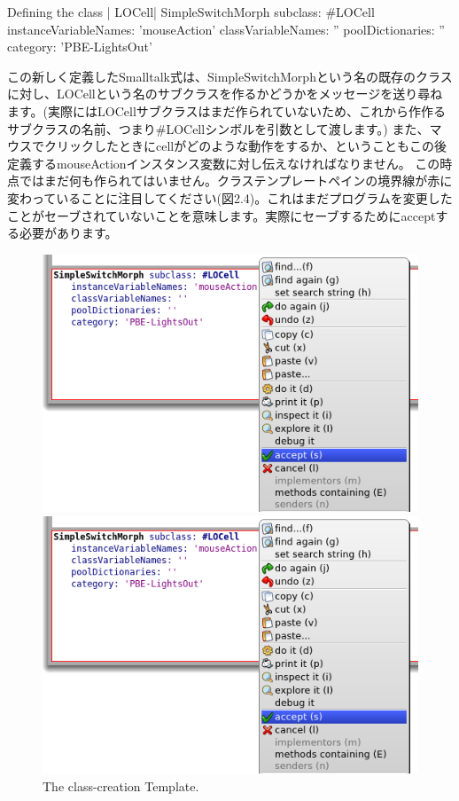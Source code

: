 \documentclass[a4paper,10pt,twoside]{book}
\begin{document}
\begin{classdef}[firstClassDef]{Defining the class \ct| LOCell|}
SimpleSwitchMorph subclass: #LOCell
   instanceVariableNames: 'mouseAction'
   classVariableNames: ''
   poolDictionaries: ''
   category: 'PBE-LightsOut'
\end{classdef}

この新しく定義したSmalltalk式は、SimpleSwitchMorphという名の既存のクラスに対し、LOCellという名のサブクラスを作るかどうかをメッセージを送り尋ねます。(実際にはLOCellサブクラスはまだ作られていないため、これから作作るサブクラスの名前、つまり#LOCellシンボルを引数として渡します。)
また、マウスでクリックしたときにcellがどのような動作をするか、ということもこの後定義するmouseActionインスタンス変数に対し伝えなければなりません。
この時点ではまだ何も作られてはいません。クラステンプレートペインの境界線が赤に変わっていることに注目してください(図2.4)。これはまだプログラムを変更したことがセーブされていないことを意味します。実際にセーブするためにacceptする必要があります。

\begin{figure}[h!t]
\ifluluelse
	{\centerline {\includegraphics[width=\textwidth]{AcceptClassDef}}}
	{\centerline {\includegraphics[scale=0.7]{AcceptClassDef}}}
\caption{The class-creation Template.
}
\end{figure}
\end{document}
